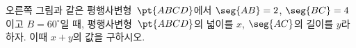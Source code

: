 \noindent\begin{minipage}[t]{0.58\linewidth}\vspace{0pt}\raggedright 오른쪽 그림과 같은 평행사변형~$\pt{ABCD}$에서 $\seg{AB}=2$, $\seg{BC}=4$이고 $B=60^\circ$일 때, 평행사변형~$\pt{ABCD}$의 넓이를 $x$, $\seg{AC}$의 길이를 $y$라 하자. 이때 $x+y$의 값을 구하시오.\end{minipage}\hfill\begin{minipage}[t]{0.4\linewidth}\vspace{0pt}\centering \resizebox{\ifdim\width>\linewidth\linewidth\else\width\fi}{!}{}\end{minipage}\par
